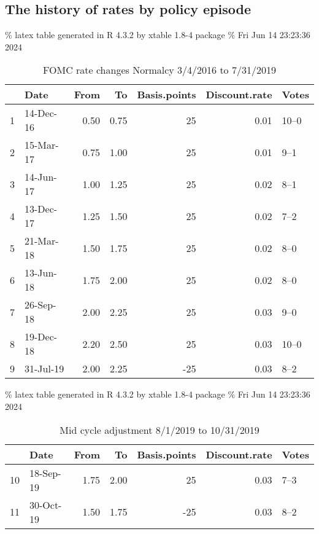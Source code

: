 \documentclass[
]{article}
\begin{document}
\hypertarget{the-history-of-rates-by-policy-episode}{%
\subsection{The history of rates by policy episode}\label{the-history-of-rates-by-policy-episode}}

\% latex table generated in R 4.3.2 by xtable 1.8-4 package
\% Fri Jun 14 23:23:36 2024

\begin{table}[ht]
\centering
\begin{tabular}{rlrrrrl}
  \hline
 & Date & From & To & Basis.points & Discount.rate & Votes \\ 
  \hline
1 & 14-Dec-16 & 0.50 & 0.75 &  25 & 0.01 & 10–0 \\ 
  2 & 15-Mar-17 & 0.75 & 1.00 &  25 & 0.01 & 9–1 \\ 
  3 & 14-Jun-17 & 1.00 & 1.25 &  25 & 0.02 & 8–1 \\ 
  4 & 13-Dec-17 & 1.25 & 1.50 &  25 & 0.02 & 7–2 \\ 
  5 & 21-Mar-18 & 1.50 & 1.75 &  25 & 0.02 & 8–0 \\ 
  6 & 13-Jun-18 & 1.75 & 2.00 &  25 & 0.02 & 8–0 \\ 
  7 & 26-Sep-18 & 2.00 & 2.25 &  25 & 0.03 & 9–0 \\ 
  8 & 19-Dec-18 & 2.20 & 2.50 &  25 & 0.03 & 10–0 \\ 
  9 & 31-Jul-19 & 2.00 & 2.25 & -25 & 0.03 & 8–2 \\ 
   \hline
\end{tabular}
\caption{FOMC rate changes Normalcy 3/4/2016 to 7/31/2019} 
\label{tab:fomcnorm}
\end{table}

\% latex table generated in R 4.3.2 by xtable 1.8-4 package
\% Fri Jun 14 23:23:36 2024

\begin{table}[ht]
\centering
\begin{tabular}{rlrrrrl}
  \hline
 & Date & From & To & Basis.points & Discount.rate & Votes \\ 
  \hline
10 & 18-Sep-19 & 1.75 & 2.00 &  25 & 0.03 & 7–3 \\ 
  11 & 30-Oct-19 & 1.50 & 1.75 & -25 & 0.03 & 8–2 \\ 
   \hline
\end{tabular}
\caption{Mid cycle adjustment 8/1/2019 to 10/31/2019} 
\label{tab:fomcadjust}
\end{table}
\end{document}
